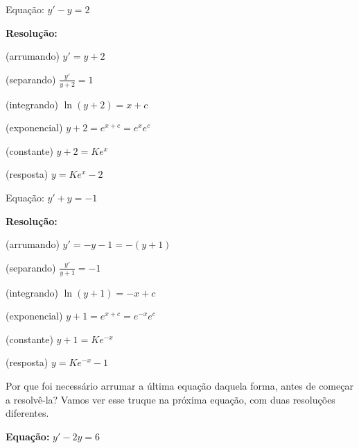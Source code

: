 \documentclass[a4paper]{article}
\begin{document}
\begin{multicols}{2}

Equação: $y' - y =2$

{\bf Resolução:}

(arrumando) $y' = y + 2$

(separando) $\frac{y'}{y+2} = 1$

\smallskip

(integrando) $\ln (y+2) = x+c$

(exponencial) $y+2 = e^{x+c}=e^{x}e^c$

(constante) $y+2=Ke^{x}$

(resposta) $y=Ke^{x}-2$

\columnbreak

Equação: $y' + y =-1$

{\bf Resolução:}

(arrumando) $y' = - y-1 = -(y+1)$

(separando) $\frac{y'}{y+1} = -1$

\smallskip

(integrando) $\ln (y+1) = -x+c$

(exponencial) $y+1 = e^{x+c}=e^{-x}e^c$

(constante) $y+1=Ke^{-x}$

(resposta) $y=Ke^{-x}-1$

\end{multicols}

Por que foi necessário arrumar a última equação daquela forma, antes
de começar a resolvê-la? Vamos ver esse truque na próxima equação, com
duas resoluções diferentes.

{\bf Equação:}
$y' - 2y = 6$
\end{document}
